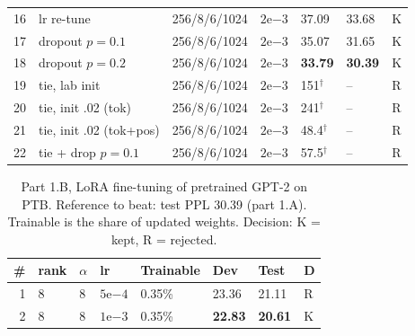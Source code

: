 \documentclass[a4paper]{article}
\begin{document}
\begin{table}[t]
\begin{tabular}{@{}rllllll@{}}
    16 & lr re-tune       & 256/8/6/1024   & $2\mathrm{e}{-3}$  & 37.09 & 33.68 & K \\
    17 & dropout $p{=}0.1$ & 256/8/6/1024  & $2\mathrm{e}{-3}$  & 35.07 & 31.65 & K \\
    18 & dropout $p{=}0.2$ & 256/8/6/1024  & $2\mathrm{e}{-3}$  & \textbf{33.79} & \textbf{30.39} & K \\
    19 & tie, lab init     & 256/8/6/1024  & $2\mathrm{e}{-3}$  & 151$^\dagger$ & -- & R \\
    20 & tie, init .02 (tok) & 256/8/6/1024 & $2\mathrm{e}{-3}$ & 241$^\dagger$ & -- & R \\
    21 & tie, init .02 (tok+pos) & 256/8/6/1024 & $2\mathrm{e}{-3}$ & 48.4$^\dagger$ & -- & R \\
    22 & tie + drop $p{=}0.1$ & 256/8/6/1024 & $2\mathrm{e}{-3}$ & 57.5$^\dagger$ & -- & R \\
    \bottomrule
  \end{tabular}
\end{table}

\begin{table}[t]
  \centering
  \caption{Part 1.B, LoRA fine-tuning of pretrained GPT-2 on PTB. Reference to beat: test PPL 30.39 (part 1.A). Trainable is the share of updated weights. Decision: K = kept, R = rejected.}
  \label{tab:partb}
  \footnotesize
  \begin{tabular}{@{}rlllllll@{}}
    \toprule
    \# & rank & $\alpha$ & lr & Trainable & Dev & Test & D \\
    \midrule
    1 & 8 & 8 & $5\mathrm{e}{-4}$ & 0.35\% & 23.36 & 21.11 & R \\
    2 & 8 & 8 & $1\mathrm{e}{-3}$ & 0.35\% & \textbf{22.83} & \textbf{20.61} & K \\
    \bottomrule
  \end{tabular}
\end{table}
\end{document}
